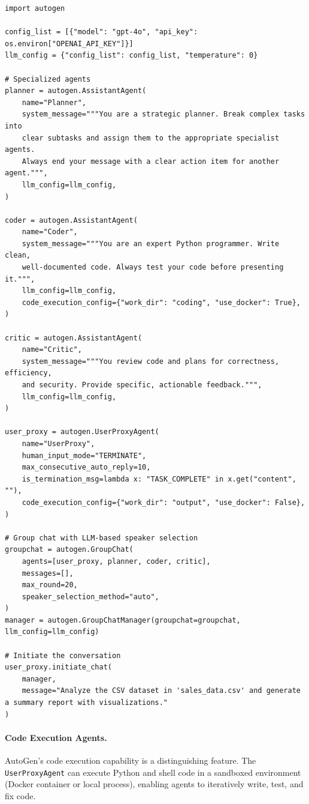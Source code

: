 \begin{lstlisting}[style=pythonstyle, caption={AutoGen multi-agent group chat}]
import autogen

config_list = [{"model": "gpt-4o", "api_key": os.environ["OPENAI_API_KEY"]}]
llm_config = {"config_list": config_list, "temperature": 0}

# Specialized agents
planner = autogen.AssistantAgent(
    name="Planner",
    system_message="""You are a strategic planner. Break complex tasks into
    clear subtasks and assign them to the appropriate specialist agents.
    Always end your message with a clear action item for another agent.""",
    llm_config=llm_config,
)

coder = autogen.AssistantAgent(
    name="Coder",
    system_message="""You are an expert Python programmer. Write clean,
    well-documented code. Always test your code before presenting it.""",
    llm_config=llm_config,
    code_execution_config={"work_dir": "coding", "use_docker": True},
)

critic = autogen.AssistantAgent(
    name="Critic",
    system_message="""You review code and plans for correctness, efficiency,
    and security. Provide specific, actionable feedback.""",
    llm_config=llm_config,
)

user_proxy = autogen.UserProxyAgent(
    name="UserProxy",
    human_input_mode="TERMINATE",
    max_consecutive_auto_reply=10,
    is_termination_msg=lambda x: "TASK_COMPLETE" in x.get("content", ""),
    code_execution_config={"work_dir": "output", "use_docker": False},
)

# Group chat with LLM-based speaker selection
groupchat = autogen.GroupChat(
    agents=[user_proxy, planner, coder, critic],
    messages=[],
    max_round=20,
    speaker_selection_method="auto",
)
manager = autogen.GroupChatManager(groupchat=groupchat, llm_config=llm_config)

# Initiate the conversation
user_proxy.initiate_chat(
    manager,
    message="Analyze the CSV dataset in 'sales_data.csv' and generate a summary report with visualizations."
)
\end{lstlisting}

\paragraph{Code Execution Agents.}
\label{code-execution-agents.}

AutoGen’s code execution capability is a distinguishing feature. The \texttt{UserProxyAgent} can execute Python and shell code in a sandboxed environment (Docker container or local process), enabling agents to iteratively write, test, and fix code.

